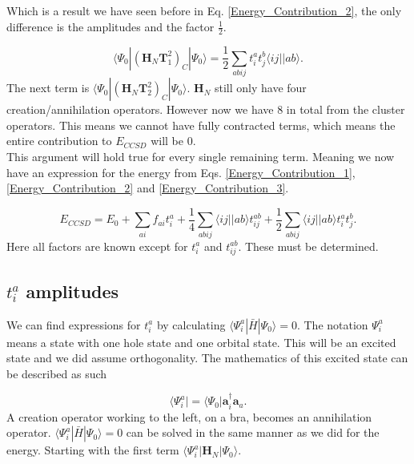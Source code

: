 Which is a result we have seen before in Eq. \eqref{Energy_Contribution_2}, the only difference is the amplitudes and the factor $\frac{1}{2}$.

\begin{equation}
\langle \Psi_0 | (\textbf{H}_N \textbf{T}_1^2)_C | \Psi_0 \rangle = \frac{1}{2} \sum_{abij} t_{i}^{a} t_j^b \langle ij||ab \rangle . \label{Energy_Contribution_3}
\end{equation}
The next term is $\langle \Psi_0 | (\textbf{H}_N \textbf{T}_2^2)_C | \Psi_0 \rangle$. $\textbf{H}_N$ still only have four creation/annihilation operators. However now we have 8 in total from the cluster operators. This means we cannot have fully contracted terms, which means the entire contribution to $E_{CCSD}$ will be 0. \\

This argument will hold true for every single remaining term. Meaning we now have an expression for the energy from Eqs. \eqref{Energy_Contribution_1}, \eqref{Energy_Contribution_2} and \eqref{Energy_Contribution_3}.

\begin{equation}
E_{CCSD} = E_0 + \sum_{ai} f_{ai} t_i^a + \frac{1}{4} \sum_{abij} \langle ij||ab \rangle t_{ij}^{ab} + \frac{1}{2} \sum_{abij} \langle ij || ab \rangle t_i^a t_j^b . \label{CCSD_TOTAL_ENERGY}
\end{equation}
Here all factors are known except for $t_i^a$ and $t_{ij}^{ab}$. These must be determined.

\subsection{$t_i^a$ amplitudes}
We can find expressions for $t_i^a$ by calculating $\langle \Psi_i^a | \bar{H} | \Psi_0 \rangle = 0$. The notation $\Psi_i^a$ means a state with one hole state and one orbital state. This will be an excited state and we did assume orthogonality. The mathematics of this excited state can be described as such

\begin{equation}
\langle \Psi_i^a | = \langle \Psi_0 | \textbf{a}^{\dag}_i \textbf{a}_a . \label{first_excited_stats}
\end{equation}
A creation operator working to the left, on a bra, becomes an annihilation operator. $\langle \Psi_i^a | \bar{H} | \Psi_0 \rangle = 0$ can be solved in the same manner as we did for the energy. Starting with the first term $\langle \Psi_i^a | \textbf{H}_N | \Psi_0 \rangle$.

